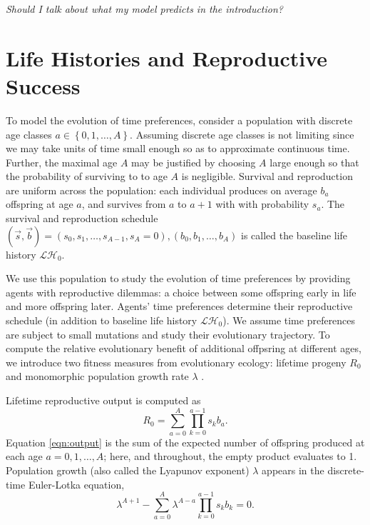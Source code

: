\documentclass[titlepage, hidelinks, 12pt]{article}
\theoremstyle{plain}
\theoremstyle{remark}
\theoremstyle{definition}
\newcommand{\LH}{\mathcal{LH}}
\begin{document}
\textit{Should I talk about what my model predicts in the introduction?}


\section{Life Histories and Reproductive Success}

To model the evolution of time preferences, consider a population with discrete age classes $a\in\left\{ 0, 1, \ldots, A \right\}$. 
Assuming discrete age classes is not limiting since we may take units of time small enough so as to approximate continuous time. Further,
the maximal age $A$ may be justified by choosing $A$ large enough so that the probability of surviving to to age $A$ is negligible. Survival
and reproduction are uniform across the population: each individual produces on average $b_a$ offspring at age $a$, and survives from $a$
to $a+1$ with with probability $s_a$. The survival and reproduction schedule $(\vec{s}, \vec{b}) = (s_0, s_1, \ldots, s_{A-1}, s_A = 0), (b_0, b_1, 
\ldots, b_A)$ is called the baseline life history $\LH_0$. 


We use this population to study the evolution of time preferences by providing agents with reproductive dilemmas: a choice
between some offspring early in life and more offspring later. Agents' time preferences determine their reproductive schedule
(in addition to baseline life history $\LH_0$). We assume 
time preferences are subject to small mutations and study their evolutionary trajectory. To compute the relative evolutionary benefit of
additional offpsring at different ages, we introduce two 
fitness measures from evolutionary ecology: lifetime progeny $R_0$ and monomorphic population growth rate $\lambda$ 
\cite{stearns92}.
 

Lifetime reproductive output is computed as
\begin{equation}
    R_0 = \sum\limits_{a = 0}^A \prod\limits_{k = 0}^{a-1} s_k b_a.
    \label{eqn:output}
\end{equation}
Equation \ref{eqn:output} is the sum of the expected number of offspring produced at each age $a= 0, 1, \ldots, A$; here,
and throughout, the empty product evaluates to 1. 
Population growth (also called the Lyapunov exponent) $\lambda$
appears in the discrete-time Euler-Lotka equation,
\begin{equation}
    \lambda^{A+1} - \sum\limits_{a = 0}^A \lambda^{A-a} \prod\limits_{k = 0}^{a-1}s_k b_k= 0.
    \label{eqn:euler-lotka}
\end{equation}
\end{document}
